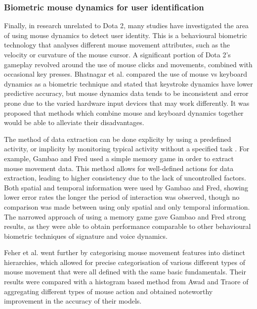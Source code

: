\documentclass[Report.tex]{subfiles}
\begin{document}
\subsubsection{Biometric mouse dynamics for user identification}
Finally, in research unrelated to Dota 2, many studies have investigated the area of using mouse dynamics to detect user identity. This is a behavioural biometric technology that analyses different mouse movement attributes, such as the velocity or curvature of the mouse cursor. A significant portion of Dota 2's gameplay revolved around the use of mouse clicks and movements, combined with occasional key presses. Bhatnagar et al. \cite{mouse-vs-keyboard} compared the use of mouse vs keyboard dynamics as a biometric technique and stated that keystroke dynamics have lower predictive accuracy, but mouse dynamics data tends to be inconsistent and error prone due to the varied hardware input devices that may work differently. It was proposed that methods which combine mouse and keyboard dynamics together would be able to alleviate their disadvantages.

The method of data extraction can be done explicity by using a predefined activity, or implicity by monitoring typical activity without a specified task \cite{mouse-dynamics}. For example, Gambao and Fred \cite{mouse-features} used a simple memory game in order to extract mouse movement data. This method allows for well-defined actions for data extraction, leading to higher consistency due to the lack of uncontrolled factors. Both spatial and temporal information were used by Gambao and Fred, showing lower error rates the longer the period of interaction was observed, though no comparison was made between using only spatial and only temporal information. The narrowed approach of using a memory game gave Gambao and Fred strong results, as they were able to obtain performance comparable to other behavioural biometric techniques of signature and voice dynamics. 


Feher et al. \cite{mouse-dynamics} went further by categorising mouse movement features into distinct hierarchies, which allowed for precise categorisation of various different types of mouse movement that were all defined with the same basic fundamentals. Their results were compared with a histogram based method from Awad and Traore \cite{mouse-histogram} of aggregating different types of mouse action and obtained noteworthy improvement in the accuracy of their models. 
\end{document}
